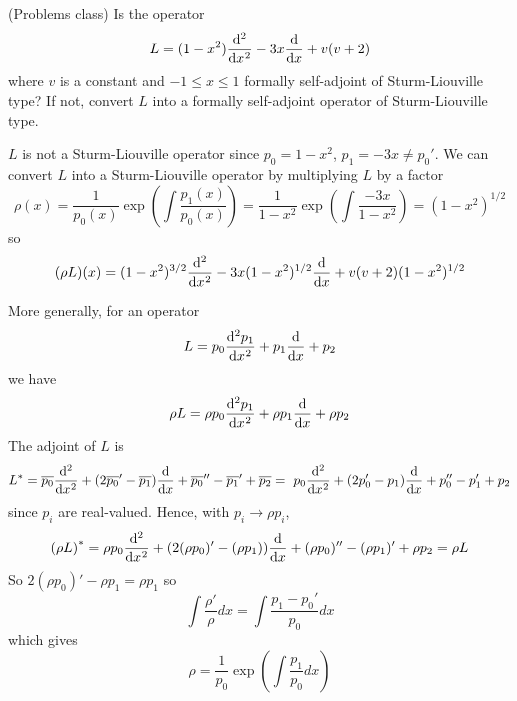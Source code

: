 \begin{example}
	(Problems class) Is the operator
	\[
		L = (1 - x^2) \diff[2]{}{x} - 3x \diff{}{x} + v(v + 2)
	\]
	where $v$ is a constant and $-1 \le x \le 1$ formally self-adjoint of Sturm-Liouville type? If not, convert $L$ into a formally self-adjoint operator of Sturm-Liouville type.

	$L$ is not a Sturm-Liouville operator since $p_0 = 1 - x^2$, $p_1 = -3x \ne p_0'$. We can convert $L$ into a Sturm-Liouville operator by multiplying $L$ by a factor
	\[
		\rho(x) = \frac{1}{p_0(x)} \exp \left( \int \frac{p_1(x)}{p_0(x)} \right) = \frac{1}{1 - x^2} \exp \left( \int \frac{-3x}{1 - x^2} \right) = {(1 - x^2)}^{1 / 2}
	\]
	so
	\[
		(\rho L) (x) = (1 - x^2)^{3 / 2} \diff[2]{}{x} - 3x (1 - x^2)^{1 / 2} \diff{}{x} + v(v + 2) (1 - x^2)^{1 / 2}
	\]
\end{example}

\begin{remark}
	More generally, for an operator
	\[
		L = p_0 \diff[2]{p_1}{x} + p_1 \diff{}{x} + p_2
	\]
	we have
	\[
		\rho L = \rho p_0 \diff[2]{p_1}{x} + \rho p_1 \diff{}{x} + \rho p_2
	\]
	The adjoint of $L$ is
	\[
		L^* = \overline{p_0} \diff[2]{}{x} + (2 \overline{p_0}' - \overline{p_1}) \diff{}{x} + \overline{p_0}'' - \overline{p_1}' + \overline{p_2} =  \
		p_0 \diff[2]{}{x} + (2 p_0' - p_1) \diff{}{x} + p_0'' - p_1' + p_2
	\]
	since $p_i$ are real-valued. Hence, with $p_i \rightarrow \rho p_i$,
	\[
		{(\rho L)}^* = \rho p_0 \diff[2]{}{x} + (2 (\rho p_0)' - (\rho p_1)) \diff{}{x} + (\rho p_0)'' - (\rho p_1)' + \rho p_2 = \rho L
	\]
	So $2 (\rho p_0)' - \rho p_1 = \rho p_1$ so
	\[
		\int \frac{\rho'}{\rho} dx = \int \frac{p_1 - p_0'}{p_0} dx
	\]
	which gives
	\[
		\rho = \frac{1}{p_0} \exp \left( \int \frac{p_1}{p_0} dx \right)
	\]
\end{remark}

